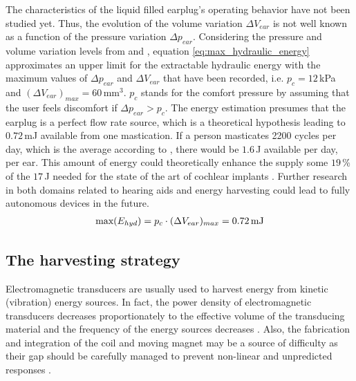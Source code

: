 \documentclass[3p,twocolumn,preprint]{elsarticle}
\begin{document}
The characteristics of the liquid filled earplug's operating behavior have not been studied yet. Thus, the evolution of the volume variation $\Delta V_{ear}$ is not well known as a function of the pressure variation $\Delta p_{ear}$. Considering the pressure and volume variation levels from \cite{Delnavaz2012} and \cite{Bouchard-Roy2020}, equation \ref{eq:max_hydraulic_energy} approximates an upper limit for the extractable hydraulic energy with the maximum values of $\Delta p_{ear}$ and $\Delta V_{ear}$ that have been recorded, i.e. $p_c=12$\,kPa and $(\Delta V_{ear})_{max}=60$\,mm$^3$. $p_c$ stands for the comfort pressure by assuming that the user feels discomfort if $\Delta p_{ear}>p_c$. The energy estimation presumes that the earplug is a perfect flow rate source, which is a theoretical hypothesis leading to $0.72$\,mJ available from one mastication. If a person masticates 2200 cycles per day, which is the average according to \cite{Goll2011}, there would be $1.6$\,J available per day, per ear. This amount of energy could theoretically enhance the supply some $19$\,\% of the $17$\,J needed for the state of the art of cochlear implants \cite{Kulah2022}. Further research in both domains related to hearing aids and energy harvesting could lead to fully autonomous devices in the future.
\begin{align}
	\text{max}(E_{hyd}) = p_c \cdot (\Delta V_{ear})_{max} = 0.72\text{\,mJ}
	\label{eq:max_hydraulic_energy}
\end{align}

	\subsection{The harvesting strategy}	
	\label{The harvesting strategy}
Electromagnetic transducers are usually used to harvest energy from kinetic (vibration) energy sources. In fact, the power density of electromagnetic transducers decreases proportionately to the effective volume of the transducing material and the frequency of the energy sources decreases \cite{Priya2017,Kulah2008}. Also, the fabrication and integration of the coil and moving magnet may be a source of difficulty as their gap should be carefully managed to prevent non-linear and unpredicted responses \cite{Caruntu2001}. 
\end{document}
